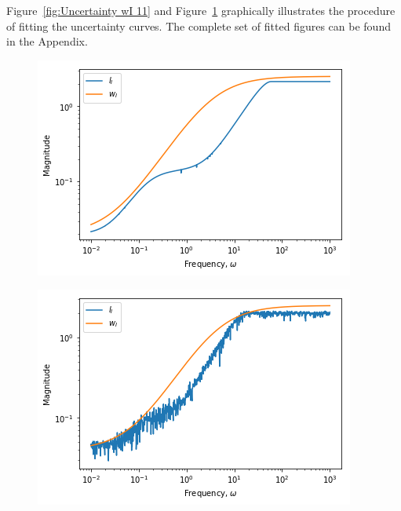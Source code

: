 Figure~\ref{fig:Uncertainty wI 11} and Figure~\ref{fig:Uncertainty wI 13} graphically illustrates the procedure of fitting the uncertainty curves. The complete set of fitted figures can be found in the Appendix.

\begin{figure}[H]
	\centering
	\begin{minipage}{.48\textwidth}
		\centering
		\includegraphics[width=\linewidth]{Figures/Uncertainty_wI_11}
		\label{fig:Uncertainty wI 11}
	\end{minipage}%
	\hfill
	\begin{minipage}{.48\textwidth}
		\centering
		\includegraphics[width=\linewidth]{Figures/Uncertainty_wI_13}
		\label{fig:Uncertainty wI 13}
	\end{minipage}
\end{figure}

